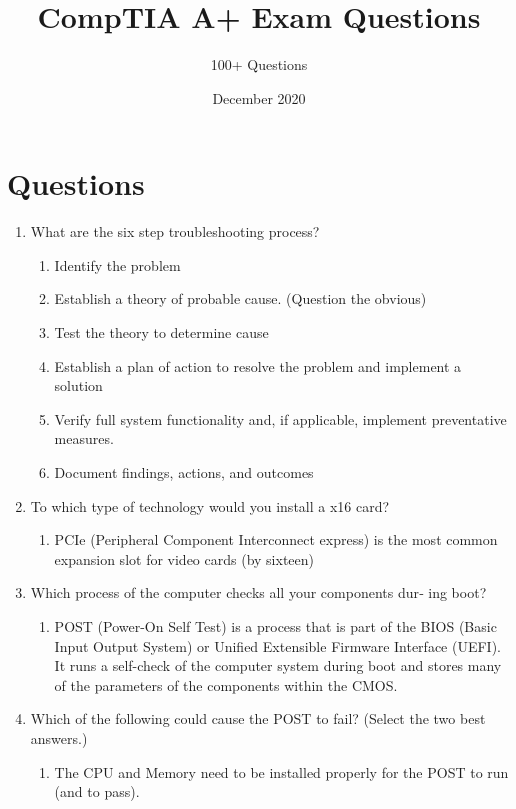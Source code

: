 \documentclass{article}
\title{CompTIA A+ Exam Questions}
\author{100+ Questions}
\date{December 2020}
\begin{document}
\maketitle
\section{Questions} 
\begin{enumerate}
    \item What are the six step troubleshooting process? 
    \begin{enumerate}
        \item Identify the problem
        \item Establish a theory of probable cause. (Question the obvious) 
        \item Test the theory to determine cause
        \item Establish a plan of action to resolve the problem and implement a solution
        \item Verify full system functionality and, if applicable, implement preventative measures. 
        \item Document findings, actions, and outcomes 
    \end{enumerate}
    \item To which type of technology would you install a x16 card?
    \begin{enumerate}
        \item PCIe (Peripheral Component Interconnect express) is the most common expansion slot for video cards (by sixteen) 
    \end{enumerate}
    \item Which process of the computer checks all your components dur‐
ing boot?
    \begin{enumerate}
        \item POST (Power-On Self Test) is a process that is part of the BIOS (Basic Input Output System) or Unified Extensible Firmware Interface (UEFI). It runs a self-check of the computer system during boot and stores many of the parameters of the components within the CMOS. 
    \end{enumerate}
    \item Which of the following could cause the POST to fail? (Select
the two best answers.) 
    \begin{enumerate}
        \item The CPU and Memory need to be installed properly for the POST to run (and to pass). 
    \end{enumerate}
    

\end{enumerate}
\end{document}
